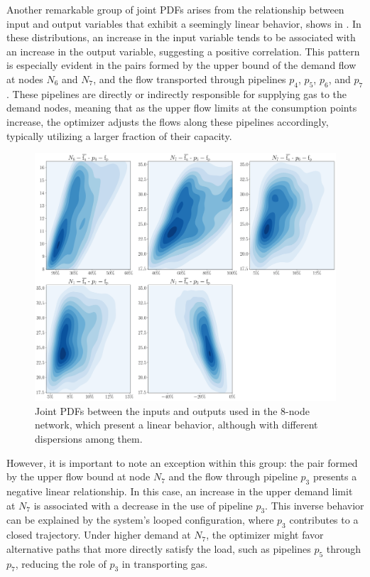 Another remarkable group of joint PDFs arises from the relationship between input and output variables that exhibit a seemingly linear behavior, shows in . In these distributions, an increase in the input variable tends to be associated with an increase in the output variable, suggesting a positive correlation. This pattern is especially evident in the pairs formed by the upper bound of the demand flow at nodes $N_6$ and $N_7$, and the flow transported through pipelines $p_4$, $p_5$, $p_6$, and $p_7$. These pipelines are directly or indirectly responsible for supplying gas to the demand nodes, meaning that as the upper flow limits at the consumption points increase, the optimizer adjusts the flows along these pipelines accordingly, typically utilizing a larger fraction of their capacity. 

\begin{figure}[htbp]
    \begin{center}
        \includegraphics[width=.7\textwidth]{figures/Chapter_NonLinealCensnet/inputs_outputs_2.png}
    \end{center}
    \caption{Joint PDFs between the inputs and outputs used in the 8-node network, which present a linear behavior, although with different dispersions among them. }\label{fig:joint_distributions_inputs_outputs_2}
\end{figure}
 
However, it is important to note an exception within this group: the pair formed by the upper flow bound at node $N_7$ and the flow through pipeline $p_3$ presents a negative linear relationship. In this case, an increase in the upper demand limit at $N_7$ is associated with a decrease in the use of pipeline $p_3$. This inverse behavior can be explained by the system's looped configuration, where $p_3$ contributes to a closed trajectory. Under higher demand at $N_7$, the optimizer might favor alternative paths that more directly satisfy the load, such as pipelines $p_5$ through $p_7$, reducing the role of $p_3$ in transporting gas.

